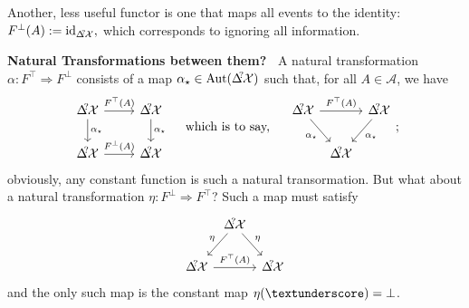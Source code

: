 \documentclass{article}
\DeclareMathOperator{\id}{id}
\theoremstyle{plain}
\theoremstyle{definition}
\begin{document}
    Another, less useful functor is one that maps all events to the identity:
    $
        F^\bot(A) := \id_{\DX?},
    $ 
    which corresponds to ignoring all information. 
    
    \smallskip
    \begin{phaseout}
    \textbf{Natural Transformations between them?~}
    A natural transformation $\alpha : F^\top \Rightarrow F^{\bot}$ consists of a map $\alpha_\star \in \mathrm{Aut}(\DX?)$ such that, for all $A \in \mathcal A$, we have
    \[
        \begin{tikzcd}
            \DX? \ar[r,"F^\top(A)"] \ar[d,"\alpha_\star"]
                & \DX? \ar[d, "\alpha_\star"] \\
            \DX? \ar[r,"F^{\bot}(A)"] & \DX?
        \end{tikzcd}
        \quad
        \text{ which is to say, }
        \quad
        \begin{tikzcd}[column sep=4]
            \DX? \ar[rr,"F^\top(A)"] \ar[dr,"\alpha_\star"']
                && \DX? \ar[dl, "\alpha_\star"] \\
            & \DX?
        \end{tikzcd};
    \]
    obviously, any constant function is such a natural transormation. But what about a natural transformation $\eta : F^\bot \Rightarrow F^\top$? Such a map must satisfy
    \[
        \begin{tikzcd}[column sep=4]
            & \DX? \ar[dr,"\eta"]\ar[dl,"\eta"'] & \\
            \DX? \ar[rr,"F^\top(A)"] && \DX? 
        \end{tikzcd}
    \]
    and the only such map is the constant map $\eta(\textunderscore) = \bot$.
    \end{phaseout}
    \smallskip
    
\end{document}
